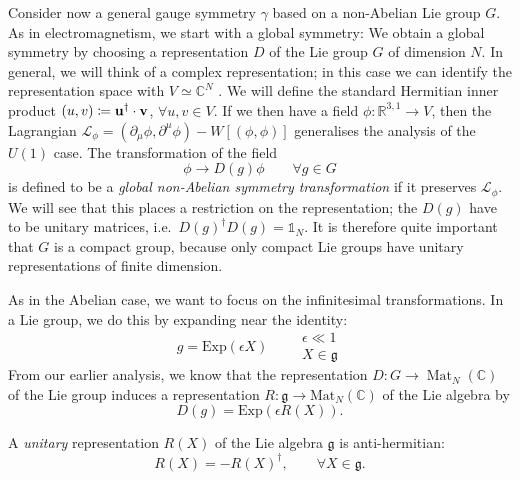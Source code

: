 Consider now a general gauge symmetry $\gamma$ based on a non-Abelian Lie group  $G$.
As in electromagnetism, we start with a global symmetry:
We obtain a global symmetry by choosing a representation  $D$  of the Lie group $G$  of dimension $N$.
In general, we will think of a complex representation; in this case we can identify the representation space with  $V \simeq \mathbb{C}^N$ .
We will define the standard Hermitian inner product $(u, v) \coloneqq \vb{u}^{\dagger} \cdot \vb{v}$, $\forall u, v \in V$.
If we then have a field  $\phi \colon \mathbb{R}^{3, 1} \to V$, then the Lagrangian $\mathcal{L}_\phi = (\partial_{\mu} \phi, \partial^{\mu} \phi) - W [(\phi, \phi)]$  generalises the analysis of the $U(1)$  case.
The transformation of the field 
\begin{equation}
  \label{eq:24-non-abel-sym-trans}
  \phi \to D(g) \phi \qquad \forall g \in G
\end{equation}
is defined to be a  \emph{global non-Abelian symmetry transformation} if it preserves $\mathcal{L}_\phi$.
We will see that this places a restriction on the representation; the $D(g)$ have to be unitary matrices, i.e.~$D(g)^{\dagger} D(g) = \mathbb{1}_N$.  It is therefore quite important that $G$ is a compact group, because only compact Lie groups have unitary representations of finite dimension.

As in the Abelian case, we want to focus on the infinitesimal transformations. In a Lie group, we do this by expanding near the identity:
\begin{equation}
  g = \text{Exp}(\epsilon X) \qquad
  \begin{gathered}
    \epsilon \ll 1 \\
    X \in \mathfrak{g}
  \end{gathered}
\end{equation}
From our earlier analysis, we know that the representation $D \colon G \to \operatorname{Mat}_N(\mathbb{C})$ of the Lie group induces a representation $R \colon \mathfrak{g} \to \text{Mat}_N(\mathbb{C})$ of the Lie algebra by
\begin{equation}
  D(g) = \text{Exp}(\epsilon R(X)).
\end{equation}

\begin{definition}[]
  A \emph{unitary} representation $R(X)$ of the Lie algebra $\mathfrak{g}$ is anti-hermitian:
  \begin{equation}
    R(X) = - R(X)^{\dagger}, \qquad \forall X \in \mathfrak{g}.
  \end{equation}
\end{definition} 

